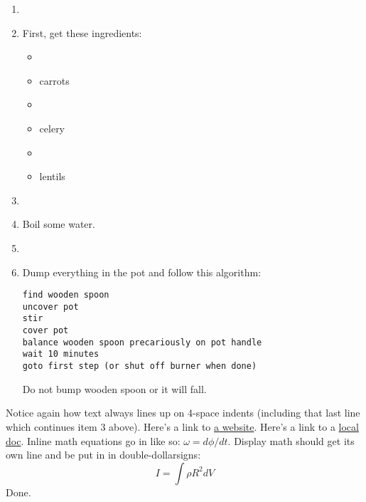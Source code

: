 \begin{enumerate}
\item \item First, get these ingredients:
\linebreak[1]

\begin{itemize}
\item \item carrots

\item \item celery

\item \item lentils

\end{itemize}



\item \item Boil some water.


\item \item Dump everything in the pot and follow
this algorithm:
\linebreak[1]

\begin{verbatim}
find wooden spoon
uncover pot
stir
cover pot
balance wooden spoon precariously on pot handle
wait 10 minutes
goto first step (or shut off burner when done)
\end{verbatim}
Do not bump wooden spoon or it will fall.


\end{enumerate}

Notice again how text always lines up on 4-space indents (including
that last line which continues item 3 above). Here's a link to \href{http://foo.bar}{a
website}. Here's a link to a \href{local-doc.html}{local doc}. 
Inline math equations go in like so: $\omega = d\phi / dt$. Display
math should get its own line and be put in in double-dollarsigns:
$$I = \int \rho R^{2} dV$$
Done.

